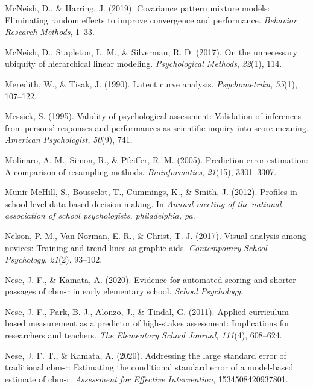 \documentclass[
  english,
  man, fleqn, noextraspace]{apa6}
\begin{document}
\leavevmode\hypertarget{ref-mcneish2019}{}%
McNeish, D., \& Harring, J. (2019). Covariance pattern mixture models: Eliminating random effects to improve convergence and performance. \emph{Behavior Research Methods}, 1--33.

\leavevmode\hypertarget{ref-mcneishetal2017}{}%
McNeish, D., Stapleton, L. M., \& Silverman, R. D. (2017). On the unnecessary ubiquity of hierarchical linear modeling. \emph{Psychological Methods}, \emph{22}(1), 114.

\leavevmode\hypertarget{ref-meredithtisak1990}{}%
Meredith, W., \& Tisak, J. (1990). Latent curve analysis. \emph{Psychometrika}, \emph{55}(1), 107--122.

\leavevmode\hypertarget{ref-messick1995}{}%
Messick, S. (1995). Validity of psychological assessment: Validation of inferences from persons' responses and performances as scientific inquiry into score meaning. \emph{American Psychologist}, \emph{50}(9), 741.

\leavevmode\hypertarget{ref-molinaro2005}{}%
Molinaro, A. M., Simon, R., \& Pfeiffer, R. M. (2005). Prediction error estimation: A comparison of resampling methods. \emph{Bioinformatics}, \emph{21}(15), 3301--3307.

\leavevmode\hypertarget{ref-munir2012}{}%
Munir-McHill, S., Bousselot, T., Cummings, K., \& Smith, J. (2012). Profiles in school-level data-based decision making. In \emph{Annual meeting of the national association of school psychologists, philadelphia, pa}.

\leavevmode\hypertarget{ref-nelson2017}{}%
Nelson, P. M., Van Norman, E. R., \& Christ, T. J. (2017). Visual analysis among novices: Training and trend lines as graphic aids. \emph{Contemporary School Psychology}, \emph{21}(2), 93--102.

\leavevmode\hypertarget{ref-nese2020asr}{}%
Nese, J. F., \& Kamata, A. (2020). Evidence for automated scoring and shorter passages of cbm-r in early elementary school. \emph{School Psychology}.

\leavevmode\hypertarget{ref-nese2011}{}%
Nese, J. F., Park, B. J., Alonzo, J., \& Tindal, G. (2011). Applied curriculum-based measurement as a predictor of high-stakes assessment: Implications for researchers and teachers. \emph{The Elementary School Journal}, \emph{111}(4), 608--624.

\leavevmode\hypertarget{ref-nese2020sem}{}%
Nese, J. F. T., \& Kamata, A. (2020). Addressing the large standard error of traditional cbm-r: Estimating the conditional standard error of a model-based estimate of cbm-r. \emph{Assessment for Effective Intervention}, 1534508420937801.
\end{document}

